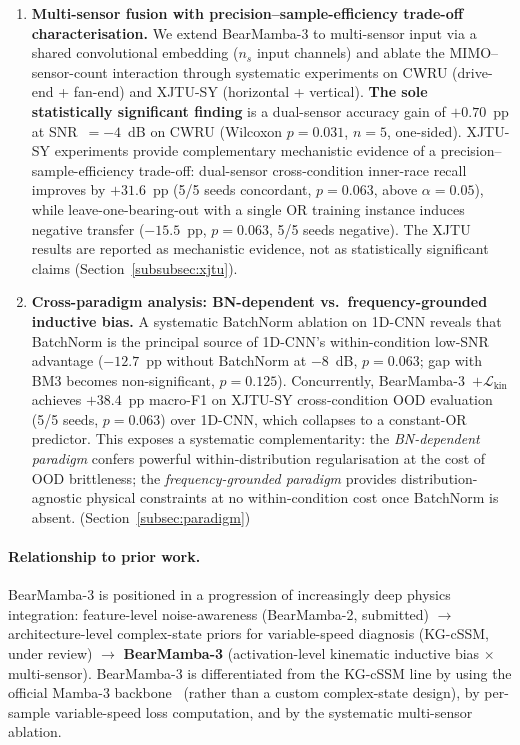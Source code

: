 \begin{enumerate}[leftmargin=*, label=\textbf{C\arabic*}]
  \item \textbf{Multi-sensor fusion with precision--sample-efficiency
        trade-off characterisation.}
        We extend BearMamba-3 to multi-sensor input via a shared convolutional
        embedding ($n_s$ input channels) and ablate the MIMO--sensor-count
        interaction through systematic experiments on CWRU (drive-end + fan-end)
        and XJTU-SY (horizontal + vertical).
        \textbf{The sole statistically significant finding} is a dual-sensor
        accuracy gain of $+0.70$~pp at SNR~$= -4$~dB on CWRU
        (Wilcoxon $p = 0.031$, $n = 5$, one-sided).
        XJTU-SY experiments provide complementary mechanistic evidence of a
        precision--sample-efficiency trade-off: dual-sensor cross-condition
        inner-race recall improves by $+31.6$~pp (5/5 seeds concordant,
        $p = 0.063$, above $\alpha=0.05$), while leave-one-bearing-out with
        a single OR training instance induces negative transfer ($-15.5$~pp,
        $p = 0.063$, 5/5 seeds negative).
        The XJTU results are reported as mechanistic evidence, not as
        statistically significant claims (Section~\ref{subsubsec:xjtu}).

  \item \textbf{Cross-paradigm analysis: BN-dependent vs.\ frequency-grounded
        inductive bias.}
        A systematic BatchNorm ablation on 1D-CNN reveals that BatchNorm is the
        principal source of 1D-CNN's within-condition low-SNR advantage
        ($-12.7$~pp without BatchNorm at $-8$~dB, $p=0.063$; gap with BM3
        becomes non-significant, $p=0.125$).
        Concurrently, BearMamba-3~$+\mathcal{L}_{\text{kin}}$ achieves
        $+38.4$~pp macro-F1 on XJTU-SY cross-condition OOD evaluation
        (5/5 seeds, $p=0.063$) over 1D-CNN, which collapses to a
        constant-OR predictor.
        This exposes a systematic complementarity: the \emph{BN-dependent
        paradigm} confers powerful within-distribution regularisation at the
        cost of OOD brittleness; the \emph{frequency-grounded paradigm}
        provides distribution-agnostic physical constraints at no within-condition
        cost once BatchNorm is absent.
        (Section~\ref{subsec:paradigm})
\end{enumerate}

\paragraph{Relationship to prior work.}
BearMamba-3 is positioned in a progression of increasingly deep physics
integration: feature-level noise-awareness (BearMamba-2, submitted) $\to$
architecture-level complex-state priors for variable-speed diagnosis
(KG-cSSM, under review) $\to$
\textbf{BearMamba-3} (activation-level kinematic inductive bias $\times$
multi-sensor).
BearMamba-3 is differentiated from the KG-cSSM line by using the official
Mamba-3 backbone~\cite{mamba3_2026} (rather than a custom complex-state
design), by per-sample variable-speed loss computation, and by the
systematic multi-sensor ablation.

